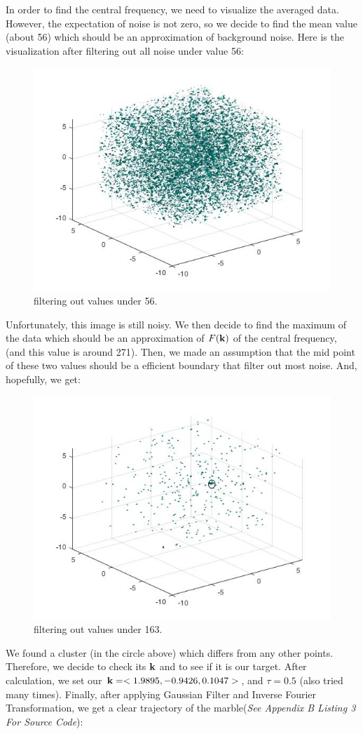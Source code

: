\documentclass[12pt]{article}
\begin{document}
In order to find the central frequency, we need to visualize the averaged data. However, the expectation of noise is not zero, so we decide to find the mean value (about 56) which should be an approximation of background noise. Here is the visualization after filtering out all noise under value 56:
\begin{figure}[H]
  \includegraphics[width=0.7\linewidth]{56.jpg}
  \caption{filtering out values under 56.}
  
  \label{fig:original_data}
\end{figure}
Unfortunately, this image is still noisy. We then decide to find the maximum of the data which should be an approximation of $F(\bf k)$ of the central frequency, (and this value is around 271). Then, we made an assumption that the mid point of these two values should be a efficient boundary that filter out most noise. And, hopefully, we get:
\begin{figure}[H]
  \includegraphics[width=0.7\linewidth]{163.jpg}
  \caption{filtering out values under 163.}
  
  \label{fig:original_data}
\end{figure}
We found a cluster (in the circle above) which differs from any other points. Therefore, we decide to check its $\bf k$ and to see if it is our target. After calculation, we set our ${\bf k} = <1.9895, -0.9426, 0.1047>$, and $\tau = 0.5$ (also tried many times). Finally, after applying Gaussian Filter and Inverse Fourier Transformation, we get a clear trajectory of the marble(\textit{See Appendix B Listing 3 For Source Code}):\\
\end{document}
